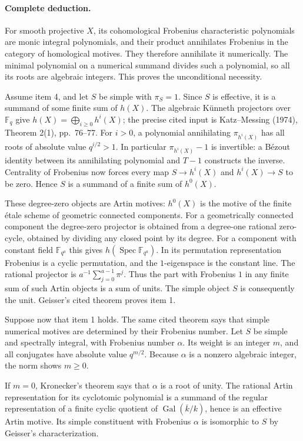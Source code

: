 \paragraph{Complete deduction.}
For smooth projective $X$, its cohomological Frobenius characteristic
polynomials are monic integral polynomials, and their product annihilates Frobenius
in the category of homological motives.  They therefore annihilate
it numerically.  The minimal polynomial on a numerical summand
divides such a polynomial, so all its roots are algebraic integers.
This proves the unconditional necessity.

Assume item 4, and let $S$ be simple with $\pi_S=1$.  Since $S$
is effective, it is a summand of some finite sum of $h(X)$.
The algebraic K\"unneth projectors over $\mathbb F_q$ give
$h(X)=\bigoplus_{i\geq0}h^i(X)$; the precise cited input is
Katz--Messing (1974), Theorem 2(1), pp.~76--77.
For $i>0$, a polynomial annihilating $\pi_{h^i(X)}$ has all roots
of absolute value $q^{i/2}>1$.  In particular $\pi_{h^i(X)}-1$
is invertible: a B\'ezout identity between its annihilating
polynomial and $T-1$ constructs the inverse.  Centrality of
Frobenius now forces every map $S\to h^i(X)$ and $h^i(X)\to S$
to be zero.  Hence $S$ is a summand of a finite sum of $h^0(X)$.

These degree-zero objects are Artin motives: $h^0(X)$ is the
motive of the finite \'etale scheme of geometric connected
components.  For a geometrically connected component the
degree-zero projector is obtained from a degree-one rational
zero-cycle, obtained by dividing any closed point by its degree.
For a component with constant field $\mathbb F_{q^a}$ this gives
$h(\operatorname{Spec}\mathbb F_{q^a})$.  In its permutation
representation Frobenius is a cyclic permutation, and the
$1$-eigenspace is the constant line.  The rational projector is
$a^{-1}\sum_{j=0}^{a-1}\pi^j$.  Thus the part with Frobenius $1$
in any finite sum of such Artin objects is a sum of units.  The
simple object $S$ is consequently the unit.  Geisser's cited
theorem proves item 1.

Suppose now that item 1 holds.  The same cited theorem says that
simple numerical motives are determined by their Frobenius number.
Let $S$ be simple and spectrally integral, with Frobenius number
$\alpha$.  Its weight is an integer $m$, and all conjugates have
absolute value $q^{m/2}$.  Because $\alpha$ is a nonzero algebraic
integer, the norm shows $m\geq0$.

If $m=0$, Kronecker's theorem says that $\alpha$ is a root of
unity.  The rational Artin representation for its cyclotomic
polynomial is a summand of the regular representation of a finite
cyclic quotient of $\operatorname{Gal}(\overline k/k)$, hence is
an effective Artin motive.  Its simple constituent with Frobenius
$\alpha$ is isomorphic to $S$ by Geisser's characterization.

